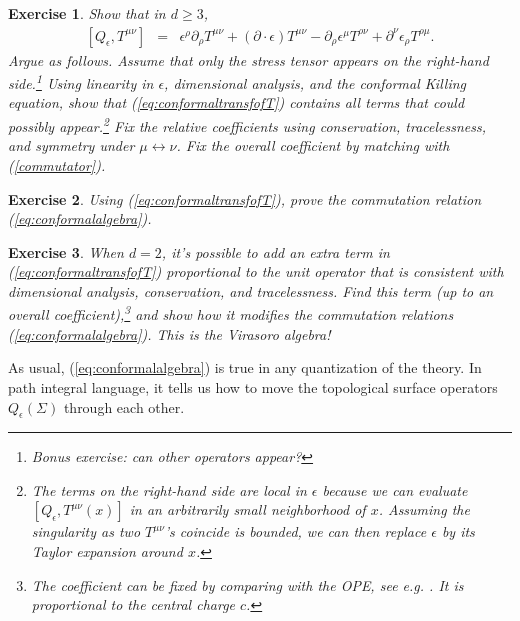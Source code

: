 \documentclass[11pt]{ws-rv9x6}
\newcommand\be{\begin{eqnarray}}
\newcommand\ee{\end{eqnarray}}
\newcommand\ptl\partial
\newcommand\e\epsilon
\newcommand\<\langle
\renewcommand\>\rangle
\renewcommand\.{\cdot}
\newtheorem{exercise}{Exercise}[section]
\begin{document}
\begin{exercise}
Show that in $d\geq 3$,
\be
\label{eq:conformaltransfofT}
[Q_\e,T^{\mu\nu}] &=& \e^\rho\ptl_\rho T^{\mu\nu}+(\ptl\.\e)T^{\mu\nu}-\ptl_\rho \e^\mu T^{\rho\nu}+\ptl^\nu\e_\rho T^{\rho\mu}.
\ee
Argue as follows. Assume that only the stress tensor appears on the right-hand side.\footnote{Bonus exercise: can other operators appear?} Using linearity in $\e$, dimensional analysis, and the conformal Killing equation, show that (\ref{eq:conformaltransfofT}) contains all terms that could possibly appear.\footnote{The terms on the right-hand side are local in $\e$ because we can evaluate $[Q_{\e},T^{\mu\nu}(x)]$ in an arbitrarily small neighborhood of $x$. Assuming the singularity as two $T^{\mu\nu}$'s coincide is bounded, we can then replace $\e$ by its Taylor expansion around $x$.}  Fix the relative coefficients using conservation, tracelessness, and symmetry under $\mu\leftrightarrow \nu$. Fix the overall coefficient by matching with (\ref{commutator}).
\end{exercise}

\begin{exercise}
Using (\ref{eq:conformaltransfofT}), prove the commutation relation (\ref{eq:conformalalgebra}).
\end{exercise}

\begin{exercise}
When $d=2$, it's possible to add an extra term in (\ref{eq:conformaltransfofT}) proportional to the unit operator that is consistent with dimensional analysis, conservation, and tracelessness.  Find this term (up to an overall coefficient),\footnote{The coefficient can be fixed by comparing with the OPE, see e.g. \cite{Polchinski:1998rq}. It is proportional to the central charge $c$.} and show how it modifies the commutation relations (\ref{eq:conformalalgebra}). This is the Virasoro algebra!
\end{exercise}

As usual, (\ref{eq:conformalalgebra}) is true in any quantization of the theory.  In path integral language, it tells us how to move the topological surface operators $Q_{\e}(\Sigma)$ through each other.
\end{document}
